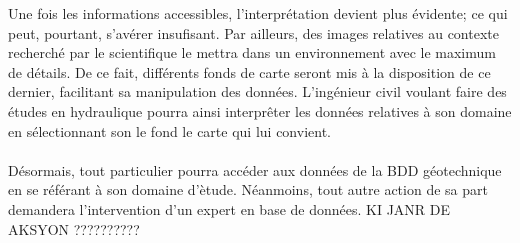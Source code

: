 \par
Une fois les informations accessibles, l'interprétation devient 
plus évidente; ce qui peut, pourtant, s'avérer insufisant. Par 
ailleurs, des images relatives au contexte recherché par le scientifique 
le mettra dans un environnement avec le maximum de détails. De ce fait, différents fonds de carte seront mis 
à la disposition de ce dernier, facilitant sa manipulation des données. 
L'ingénieur civil voulant faire des études en hydraulique pourra ainsi 
interprêter les données relatives à son domaine en sélectionnant son 
le fond le carte qui lui convient.
\paragraph{}
Désormais, tout particulier pourra accéder aux données de la BDD 
géotechnique en se référant à son domaine d'ètude. Néanmoins, tout 
autre action de sa part demandera l'intervention d'un expert en base 
de données. KI JANR DE AKSYON ??????????